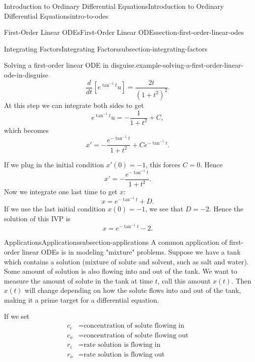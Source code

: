 \documentclass[oneside,10pt,]{book}
\numberwithin{equation}{section}
\newcommand{\dv}[3][]{\dfrac{d^{#1} #2}{d #3^{#1}}}
\begin{document}
\begin{chapterptx}{Introduction to Ordinary Differential Equations}{}{Introduction to Ordinary Differential Equations}{}{}{intro-to-odes}
\begin{sectionptx}{First-Order Linear ODEs}{}{First-Order Linear ODEs}{}{}{section-first-order-linear-odes}
\begin{subsectionptx}{Integrating Factors}{}{Integrating Factors}{}{}{subsection-integrating-factors}
\begin{example}{Solving a first-order linear ODE in disguise.}{example-solving-a-first-order-linear-ode-in-disguise}
\begin{equation*}
\dv{}{t}[e^{\tan^{-1}t}u] = \frac{2t}{(1+t^{2})^{2}}.
\end{equation*}
At this step we can integrate both sides to get%
\begin{equation*}
e^{\tan^{-1}t}u = -\frac{1}{1+t^{2}}+C,
\end{equation*}
which becomes%
\begin{equation*}
x' = -\frac{e^{-\tan^{-1}t}}{1+t^{2}}+Ce^{-\tan^{-1}t}.
\end{equation*}
%
\par
\hypertarget{p-84}{}%
If we plug in the initial condition \(x'(0) = -1\), this forces \(C=0\). Hence%
\begin{equation*}
x' = -\frac{e^{-\tan^{-1}t}}{1+t^{2}}.
\end{equation*}
Now we integrate one last time to get \(x\):%
\begin{equation*}
x = e^{-\tan^{-1}t}+D.
\end{equation*}
If we use the last initial condition \(x(0)=-1\), we see that \(D = -2\). Hence the solution of this IVP is%
\begin{equation*}
x = e^{-\tan^{-1}t}-2.
\end{equation*}
%
\end{example}
\end{subsectionptx}
%
%
\typeout{************************************************}
\typeout{************************************************}
%
\begin{subsectionptx}{Applications}{}{Applications}{}{}{subsection-applications}
\hypertarget{p-85}{}%
A common application of first-order linear ODEs is in modeling "mixture" problems. Suppose we have a tank which contains a solution (mixture of solute and solvent, such as salt and water). Some amount of solution is also flowing into and out of the tank. We want to measure the amount of solute in the tank at time \(t\), call this amount \(x(t)\). Then \(x(t)\) will change depending on how the solute flows into and out of the tank, making it a prime target for a differential equation.%
\par
\hypertarget{p-86}{}%
If we set%
\begin{align*}
c_{i} & =\text{concentration of solute flowing in} \\
c_{o} & =\text{concentration of solute flowing out} \\
r_{i} & =\text{rate solution is flowing in} \\
r_{o} & = \text{rate solution is flowing out} 
\end{align*}

\end{subsectionptx}
\end{sectionptx}
\end{chapterptx}
\end{document}
